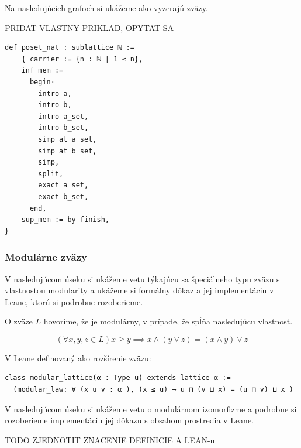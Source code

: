 \documentclass[a4paper,10pt,oneside]{report}%
\begin{document}
Na nasledujúcich grafoch si ukážeme ako vyzerajú zväzy.

PRIDAT VLASTNY PRIKLAD, OPYTAT SA
\begin{lstlisting}
def poset_nat : sublattice ℕ :=
    { carrier := {n : ℕ | 1 ≤ n},
    inf_mem :=
      begin·
        intro a,
        intro b,
        intro a_set,
        intro b_set,
        simp at a_set,
        simp at b_set,
        simp,
        split,
        exact a_set,
        exact b_set,
      end,
    sup_mem := by finish,
}
\end{lstlisting}

\subsubsection{Modulárne zväzy}

V nasledujúcom úseku si ukážeme vetu týkajúcu sa špeciálneho typu zväzu s vlastnosťou
    modularity a ukážeme si formálny dôkaz a jej implementáciu v Leane, ktorú si
    podrobne rozoberieme.

O zväze $L$ hovoríme, že je modulárny, v prípade, že spĺňa nasledujúcu vlastnosť.

\begin{equation*}
    (\forall x,y,z \in L) x \geq y \implies x \wedge ( y \vee z) = (x \wedge y) \vee z
\end{equation*}

V Leane definovaný ako rozšírenie zväzu:

\begin{lstlisting}
class modular_lattice(α : Type u) extends lattice α :=
  (modular_law: ∀ (x u v : α ), (x ≤ u) → u ⊓ (v ⊔ x) = (u ⊓ v) ⊔ x )
\end{lstlisting}

V nasledujúcom úseku si ukážeme vetu o modulárnom izomorfizme a podrobne
    si rozoberieme implementáciu jej dôkazu s obsahom prostredia v Leane.

TODO ZJEDNOTIT ZNACENIE DEFINICIE A LEAN-u
\end{document}
